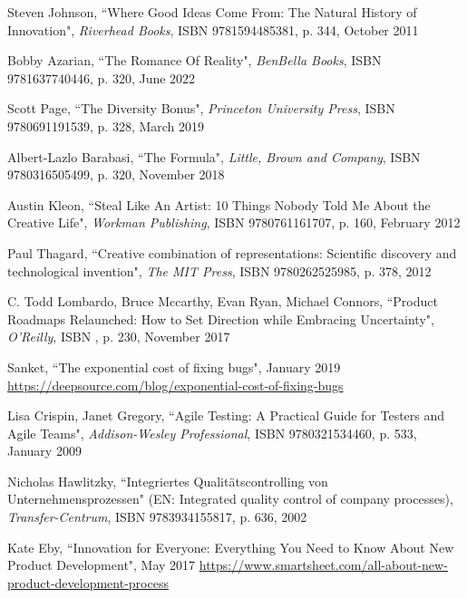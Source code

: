 \begin{thebibliography}{100}

 Steven Johnson, ``Where Good Ideas Come From: The Natural History of Innovation",
\emph{Riverhead Books}, ISBN 9781594485381, p. 344, October 2011

 Bobby Azarian, ``The Romance Of Reality", \emph{BenBella Books}, ISBN 9781637740446, 
p. 320, June 2022

 Scott Page, ``The Diversity Bonus", \emph{Princeton University Press}, ISBN 9780691191539, 
p. 328, March 2019

 Albert-Lazlo Barabasi, ``The Formula", \emph{Little, Brown and Company}, ISBN 9780316505499, 
p. 320, November 2018 

 Austin Kleon, ``Steal Like An Artist: 10 Things Nobody Told Me About the Creative Life", 
\emph{Workman Publishing}, ISBN 9780761161707, p. 160, February 2012

 Paul Thagard, ``Creative combination of representations: Scientific discovery and 
technological invention", \emph{The MIT Press}, ISBN 9780262525985, p. 378, 2012

 C. Todd Lombardo, Bruce Mccarthy, Evan Ryan, Michael Connors, ``Product Roadmaps Relaunched: How 
to Set Direction while Embracing Uncertainty", \emph{O'Reilly}, ISBN , p. 230, November 2017

 Sanket, ``The exponential cost of fixing bugs", January 2019\\
\href{https://deepsource.com/blog/exponential-cost-of-fixing-bugs}{https://deepsource.com/blog/exponential-cost-of-fixing-bugs}

 Lisa Crispin, Janet Gregory, ``Agile Testing: A Practical Guide for Testers and Agile 
Teams", \emph{Addison-Wesley Professional}, ISBN 9780321534460, p. 533, January 2009

 Nicholas Hawlitzky, ``Integriertes Qualitätscontrolling von Unternehmensprozessen" (EN: 
Integrated quality control of company processes), \emph{Transfer-Centrum}, ISBN 9783934155817, p. 636, 2002

 Kate Eby, ``Innovation for Everyone: Everything You Need to Know About New Product 
Development", May 2017
\href{https://www.smartsheet.com/all-about-new-product-development-process}{https://www.smartsheet.com/all-about-new-product-development-process}


\end{thebibliography}
